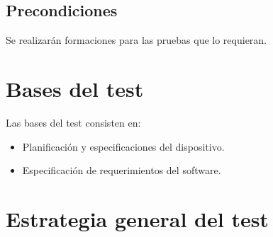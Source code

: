 \documentclass[11pt]{article}
\begin{document}
\subsection{Precondiciones}
Se realizarán formaciones para las pruebas que lo requieran.
\section{Bases del test}
Las bases del test consisten en:
\begin{itemize}
    \item Planificación y especificaciones del dispositivo.
    \item Especificación de requerimientos del software.
\end{itemize}
\section{Estrategia general del test}
\end{document}
